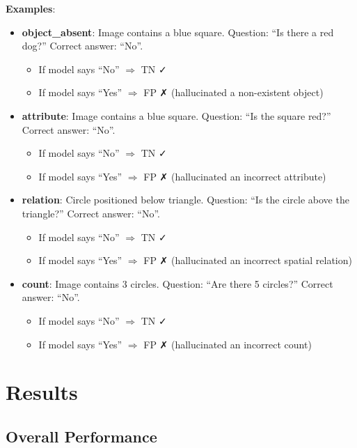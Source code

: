 \documentclass[11pt,a4paper]{article}
\begin{document}
\textbf{Examples}:
\begin{itemize}
    \item \textbf{object\_absent}: Image contains a blue square. Question: \enquote{Is there a red dog?} Correct answer: \enquote{No}.
        \begin{itemize}
            \item If model says \enquote{No} $\Rightarrow$ TN ✓
            \item If model says \enquote{Yes} $\Rightarrow$ FP ✗ (hallucinated a non-existent object)
        \end{itemize}
    \item \textbf{attribute}: Image contains a blue square. Question: \enquote{Is the square red?} Correct answer: \enquote{No}.
        \begin{itemize}
            \item If model says \enquote{No} $\Rightarrow$ TN ✓
            \item If model says \enquote{Yes} $\Rightarrow$ FP ✗ (hallucinated an incorrect attribute)
        \end{itemize}
    \item \textbf{relation}: Circle positioned below triangle. Question: \enquote{Is the circle above the triangle?} Correct answer: \enquote{No}.
        \begin{itemize}
            \item If model says \enquote{No} $\Rightarrow$ TN ✓
            \item If model says \enquote{Yes} $\Rightarrow$ FP ✗ (hallucinated an incorrect spatial relation)
        \end{itemize}
    \item \textbf{count}: Image contains 3 circles. Question: \enquote{Are there 5 circles?} Correct answer: \enquote{No}.
        \begin{itemize}
            \item If model says \enquote{No} $\Rightarrow$ TN ✓
            \item If model says \enquote{Yes} $\Rightarrow$ FP ✗ (hallucinated an incorrect count)
        \end{itemize}
\end{itemize}

\section{Results}

\subsection{Overall Performance}
\end{document}
